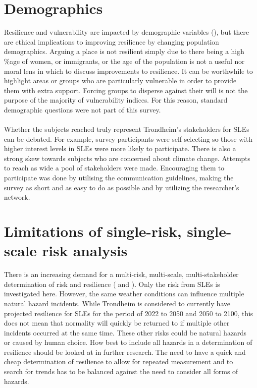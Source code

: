 \paragraph{}



\section{Demographics}
Resilience and vulnerability are impacted by demographic variables (\cite{rod_integrated_2012}), but there are ethical implications to improving resilience by changing population demographics. Arguing a place is not resilient simply due to there being a high \%age of women, or immigrants, or the age of the population is not a useful nor moral lens in which to discuss improvements to resilience. It can be worthwhile to highlight areas or groups who are particularly vulnerable in order to provide them with extra support. Forcing groups to disperse against their will is not the purpose of the majority of vulnerability indices. For this reason, standard demographic questions were not part of this survey. 


\paragraph{}
Whether the subjects reached truly represent Trondheim's stakeholders for SLEs can be debated. For example, survey participants were self selecting so those with higher interest levels in SLEs were more likely to participate. There is also a strong skew towards subjects who are concerned about climate change. Attempts to reach as wide a pool of stakeholders were made. Encouraging them to participate was done by utilising the communication guidelines, making the survey as short and as easy to do as possible and by utilizing the researcher's network. 



\section{Limitations of single-risk, single-scale risk analysis}
There is an increasing demand for a multi-risk, multi-scale, multi-stakeholder determination of risk and resilience (\cite{gerkensmeier_governing_2018} and \cite{cutter_community_2020}).  Only the risk from SLEs is investigated here. However, the same weather conditions can influence multiple natural hazard incidents. While Trondheim is considered to currently have projected resilience for SLEs for the period of 2022 to 2050 and 2050 to 2100, this does not mean that normality will quickly be returned to if multiple other incidents occurred at the same time. These other risks could be natural hazards or caused by human choice. How best to include all hazards in a determination of resilience should be looked at in further research. The need to have a quick and cheap determination of resilience to allow for repeated measurement and to search for trends has to be balanced against the need to consider all forms of hazards. 
